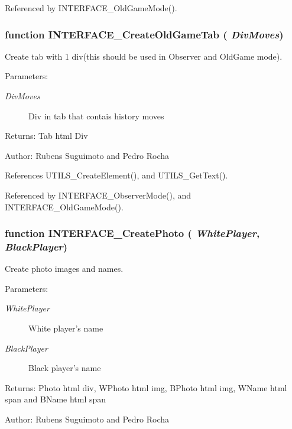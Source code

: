 Referenced by INTERFACE\_\-OldGameMode().
\subsubsection[INTERFACE\_\-CreateOldGameTab]{\setlength{\rightskip}{0pt plus 5cm}function INTERFACE\_\-CreateOldGameTab ( {\em DivMoves})}\label{board_8js_c82f68620db8b3af9619086b0fe88504}


Create tab with 1 div(this should be used in Observer and OldGame mode). 

\begin{Desc}
\item[Parameters:]
\begin{description}
\item[{\em DivMoves}]Div in tab that contais history moves \end{description}
\end{Desc}
\begin{Desc}
\item[Returns:]Tab html Div \end{Desc}
\begin{Desc}
\item[Author:]Rubens Suguimoto and Pedro Rocha \end{Desc}


References UTILS\_\-CreateElement(), and UTILS\_\-GetText().

Referenced by INTERFACE\_\-ObserverMode(), and INTERFACE\_\-OldGameMode().
\subsubsection[INTERFACE\_\-CreatePhoto]{\setlength{\rightskip}{0pt plus 5cm}function INTERFACE\_\-CreatePhoto ( {\em WhitePlayer}, \/   {\em BlackPlayer})}\label{board_8js_7abebff51fceb3d49d1c25e86d2610b0}


Create photo images and names. 

\begin{Desc}
\item[Parameters:]
\begin{description}
\item[{\em WhitePlayer}]White player's name \item[{\em BlackPlayer}]Black player's name \end{description}
\end{Desc}
\begin{Desc}
\item[Returns:]Photo html div, WPhoto html img, BPhoto html img, WName html span and BName html span \end{Desc}
\begin{Desc}
\item[Author:]Rubens Suguimoto and Pedro Rocha \end{Desc}


